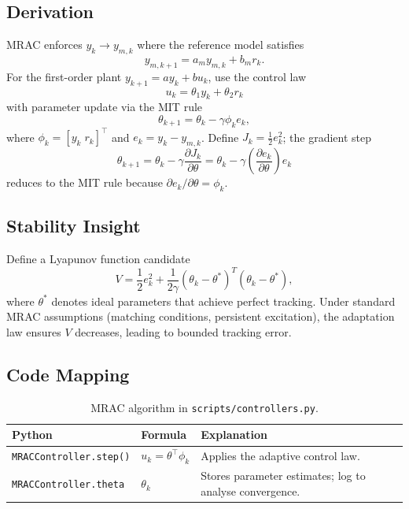 \subsection{Derivation}
MRAC enforces $y_k \rightarrow y_{m,k}$ where the reference model satisfies
\begin{equation}
    y_{m,k+1} = a_m y_{m,k} + b_m r_k.
\end{equation}
For the first-order plant $y_{k+1} = a y_k + b u_k$, use the control law
\begin{equation}
    u_k = \theta_1 y_k + \theta_2 r_k
\end{equation}
with parameter update via the MIT rule
\begin{equation}
    \theta_{k+1} = \theta_k - \gamma \phi_k e_k,
\end{equation}
where $\phi_k = [y_k\; r_k]^\top$ and $e_k = y_k - y_{m,k}$. Define $J_k = \tfrac{1}{2} e_k^2$; the gradient step
\[
    \theta_{k+1} = \theta_k - \gamma \frac{\partial J_k}{\partial \theta}
                 = \theta_k - \gamma \left(\frac{\partial e_k}{\partial \theta}\right) e_k
\]
reduces to the MIT rule because $\partial e_k / \partial \theta = \phi_k$.

\subsection{Stability Insight}
Define a Lyapunov function candidate
\begin{equation}
    V = \frac{1}{2} e_k^2 + \frac{1}{2 \gamma} (\theta_k - \theta^*)^T (\theta_k - \theta^*),
\end{equation}
where $\theta^*$ denotes ideal parameters that achieve perfect tracking. Under standard MRAC assumptions (matching conditions, persistent excitation), the adaptation law ensures $V$ decreases, leading to bounded tracking error.

\subsection{Code Mapping}
\begin{table}[h]
    \centering
    \small
    \renewcommand{\arraystretch}{1.2}
    \begin{tabularx}{\linewidth}{|>{\raggedright\arraybackslash}p{4cm}|X|X|}
        \hline
        \textbf{Python} & \textbf{Formula} & \textbf{Explanation} \\
        \hline
        \texttt{MRACController.step()} & $u_k = \theta^\top \phi_k$ & Applies the adaptive control law. \\
        \hline
        \texttt{MRACController.theta} & $\theta_k$ & Stores parameter estimates; log to analyse convergence. \\
        \hline
    \end{tabularx}
    \caption{MRAC algorithm in \texttt{scripts/controllers.py}.}
\end{table}

